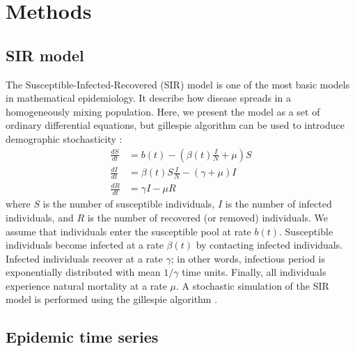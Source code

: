 \documentclass{article}
\begin{document}
\section{Methods}

\subsection{SIR model}

The Susceptible-Infected-Recovered (SIR) model is one of the most basic models in mathematical epidemiology.
It describe how disease spreads in a homogeneously mixing population.
Here, we present the model as a set of ordinary differential equations, but gillespie algorithm can be used to introduce demographic stochasticity \citep{gillespie1976general}:
\begin{equation}\label{eq:sir}
\begin{aligned}
\frac{dS}{dt} &= b(t) - \left(\beta(t) \frac{I}{N} + \mu \right) S\\
\frac{dI}{dt} &= \beta(t) S \frac{I}{N} - (\gamma + \mu) I\\
\frac{dR}{dt} &= \gamma I - \mu R
\end{aligned}
\end{equation}
where $S$ is the number of susceptible individuals, $I$ is the number of infected individuals, and $R$ is the number of recovered (or removed) individuals.
We assume that individuals enter the susceptible pool at rate $b(t)$.
Susceptible individuals become infected at a rate $\beta(t)$ by contacting infected individuals.
Infected individuals recover at a rate $\gamma$;
in other words, infectious period is exponentially distributed with mean $1/\gamma$ time units.
Finally, all individuals experience natural mortality at a rate $\mu$.
A stochastic simulation of the SIR model is performed using the gillespie algorithm \citep{gillespie1976general}.

\subsection{Epidemic time series}
\end{document}
